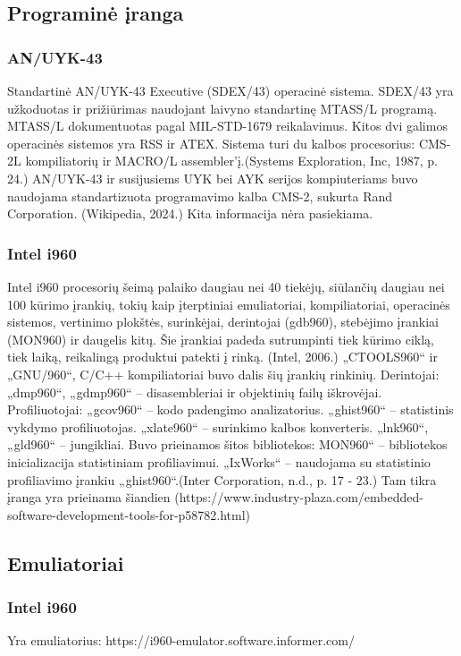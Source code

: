 \documentclass{article}
\begin{document}
\subsection{Programinė įranga}
\subsubsection{AN/UYK-43}
Standartinė AN/UYK-43 Executive (SDEX/43) operacinė sistema. SDEX/43 yra
užkoduotas ir prižiūrimas naudojant laivyno standartinę MTASS/L programą. MTASS/L dokumentuotas pagal MIL-STD-1679 reikalavimus. Kitos dvi galimos operacinės sistemos yra RSS ir ATEX. Sistema turi du kalbos
procesorius: CMS-2L kompiliatorių ir MACRO/L assembler'į.(Systems Exploration, Inc, 1987, p. 24.) AN/UYK-43 ir susijusiems UYK bei AYK serijos kompiuteriams buvo naudojama standartizuota programavimo kalba CMS-2, sukurta Rand Corporation. (Wikipedia, 2024.) Kita informacija nėra pasiekiama.
\subsubsection{Intel i960}
Intel i960 procesorių šeimą palaiko daugiau nei 40 tiekėjų, siūlančių daugiau nei 100 kūrimo įrankių, tokių kaip įterptiniai emuliatoriai, kompiliatoriai, operacinės sistemos, vertinimo plokštės, surinkėjai, derintojai (gdb960), stebėjimo įrankiai (MON960) ir daugelis kitų. Šie įrankiai padeda sutrumpinti tiek kūrimo ciklą, tiek laiką, reikalingą produktui patekti į rinką. (Intel, 2006.) „CTOOLS960“ ir „GNU/960“, C/C++ kompiliatoriai buvo dalis šių įrankių rinkinių.  Derintojai: „dmp960“, „gdmp960“ – disasembleriai ir objektinių failų iškrovėjai. Profiliuotojai: „gcov960“ – kodo padengimo analizatorius. „ghist960“ – statistinis vykdymo profiliuotojas. „xlate960“ – surinkimo kalbos konverteris. „lnk960“, „gld960“ – jungikliai. Buvo prieinamos šitos bibliotekos: MON960“ – bibliotekos inicializacija statistiniam profiliavimui. „IxWorks“ – naudojama su statistinio profiliavimo įrankiu „ghist960“.(Inter Corporation, n.d., p. 17 - 23.) Tam tikra įranga yra prieinama šiandien (https://www.industry-plaza.com/embedded-software-development-tools-for-p58782.html)
\subsection{Emuliatoriai}
\subsubsection{Intel i960}
Yra emuliatorius: https://i960-emulator.software.informer.com/
\end{document}
